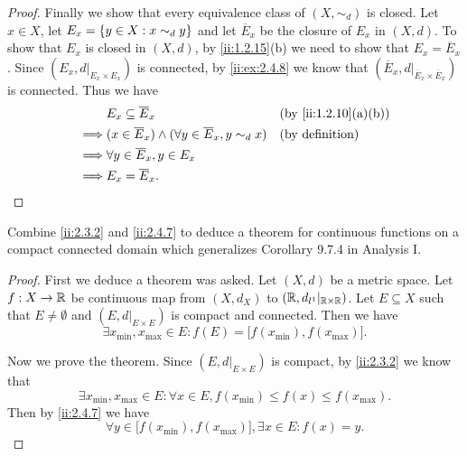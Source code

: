 \begin{proof}
  Finally we show that every equivalence class of \((X, \sim_d)\) is closed.
  Let \(x \in X\), let \(E_x = \left\lbrace y \in X : x \sim_d y\right\rbrace\) and let \(\overline{E}_x\) be the closure of \(E_x\) in \((X, d)\).
  To show that \(E_x\) is closed in \((X, d)\), by \cref{ii:1.2.15}(b) we need to show that \(E_x = \overline{E}_x\).
  Since \((E_x, d|_{E_x \times E_x})\) is connected, by \cref{ii:ex:2.4.8} we know that \((\overline{E}_x, d|_{\overline{E}_x \times \overline{E}_x})\) is connected.
  Thus we have
  \begin{align*}
             & E_x \subseteq \overline{E}_x                                            &  & \by{ii:1.2.10}[a,b]    \\
    \implies & (x \in \overline{E}_x) \land (\forall y \in \overline{E}_x, y \sim_d x) &  & \text{(by definition)} \\
    \implies & \forall y \in \overline{E}_x, y \in E_x                                                             \\
    \implies & E_x = \overline{E}_x.
  \end{align*}
\end{proof}

\begin{ex}\label{ii:ex:2.4.10}
  Combine \cref{ii:2.3.2} and \cref{ii:2.4.7} to deduce a theorem for continuous functions on a compact connected domain which generalizes Corollary 9.7.4 in Analysis I.
\end{ex}

\begin{proof}
  First we deduce a theorem was asked.
  Let \((X, d)\) be a metric space.
  Let \(f : X \to \mathbb{R}\) be continuous map from \((X, d_X)\) to \((\mathbb{R}, d_{l^1}|_{\mathbb{R} \times \mathbb{R}})\).
  Let \(E \subseteq X\) such that \(E \neq \emptyset\) and \((E, d|_{E \times E})\) is compact and connected.
  Then we have
  \[
    \exists x_{\min}, x_{\max} \in E : f(E) = \big[f(x_{\min}), f(x_{\max})\big].
  \]

  Now we prove the theorem.
  Since \((E, d|_{E \times E})\) is compact, by \cref{ii:2.3.2} we know that
  \[
    \exists x_{\min}, x_{\max} \in E : \forall x \in E, f(x_{\min}) \leq f(x) \leq f(x_{\max}).
  \]
  Then by \cref{ii:2.4.7} we have
  \[
    \forall y \in \big[f(x_{\min}), f(x_{\max})\big], \exists x \in E : f(x) = y.
  \]
\end{proof}
